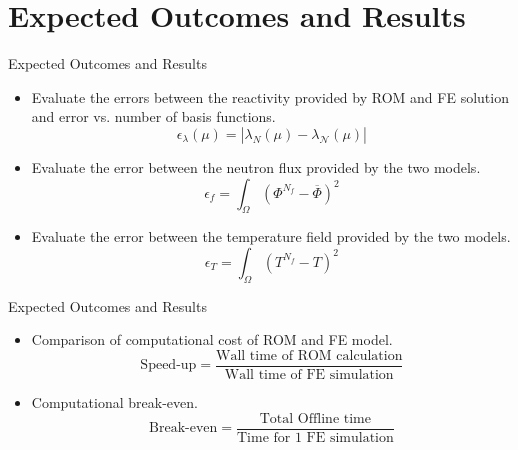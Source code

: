 \documentclass{beamer}
\renewcommand{\vec}[1]{\ensuremath{\overline{#1}}}
\begin{document}
\section{Expected Outcomes and Results}
\begin{frame}{Expected Outcomes and Results}
    \begin{itemize}
        \item Evaluate the errors between the reactivity provided by ROM and FE solution and error vs. number of basis functions.
            \[\epsilon_{\lambda}(\mu) = \left\vert\lambda_N(\mu) - \lambda_{\mathcal{N}}(\mu)\right\vert\]
        \item Evaluate the error between the neutron flux provided by the two models.
            \[\epsilon_{f} = \int_{\Omega}(\Phi^{N_f} - \vec{\Phi})^2\]
        \item Evaluate the error between the temperature field provided by the two models.
            \[\epsilon_{T} = \int_{\Omega}(T^{N_f} - {T})^2\]
    \end{itemize}
\end{frame}
\begin{frame}{Expected Outcomes and Results}
    \begin{itemize}
        \item Comparison of computational cost of ROM and FE model.
            \[\text{Speed-up} = \frac{\text{Wall time of ROM calculation}}{\text{Wall time of FE simulation}}\]
        \item Computational break-even.
            \[\text{Break-even} = \frac{\text{Total Offline time}}{\text{Time for 1 FE simulation}}\]
    \end{itemize}
\end{frame}
\end{document}
